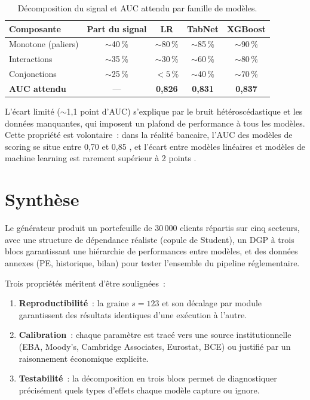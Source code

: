 \documentclass[12pt, a4paper, twoside, openright]{report}
\theoremstyle{definition}
\begin{document}
\begin{table}[htbp]
\centering
\caption{Décomposition du signal et AUC attendu par famille de modèles.}
\label{tab:signal_decomposition}
\begin{tabular}{lcccc}
\toprule
Composante & Part du signal & LR & TabNet & XGBoost \\
\midrule
Monotone (paliers) & $\sim$40\,\% & $\sim$80\,\% & $\sim$85\,\% & $\sim$90\,\% \\
Interactions         & $\sim$35\,\% & $\sim$30\,\% & $\sim$60\,\% & $\sim$80\,\% \\
Conjonctions         & $\sim$25\,\% & $< 5\,\%$    & $\sim$40\,\% & $\sim$70\,\% \\
\midrule
\textbf{AUC attendu} & --- & \textbf{0{,}826} & \textbf{0{,}831} & \textbf{0{,}837} \\
\bottomrule
\end{tabular}
\end{table}

L'écart limité ($\sim$1{,}1 point d'AUC) s'explique par le bruit hétéroscédastique et les données manquantes, qui imposent un plafond de performance à tous les modèles.
Cette propriété est volontaire~: dans la réalité bancaire, l'AUC des modèles de scoring se situe entre 0{,}70 et 0{,}85 \citep{siddiqi2006}, et l'écart entre modèles linéaires et modèles de machine learning est rarement supérieur à 2 points \citep{grinsztajn2022}.


\section{Synthèse}
\label{sec:donnees:synthese}

Le générateur produit un portefeuille de 30\,000 clients répartis sur cinq secteurs, avec une structure de dépendance réaliste (copule de Student), un DGP à trois blocs garantissant une hiérarchie de performances entre modèles, et des données annexes (PE, historique, bilan) pour tester l'ensemble du pipeline réglementaire.

Trois propriétés méritent d'être soulignées~:
\begin{enumerate}[nosep]
  \item \textbf{Reproductibilité}~: la graine $s = 123$ et son décalage par module garantissent des résultats identiques d'une exécution à l'autre.
  \item \textbf{Calibration}~: chaque paramètre est tracé vers une source institutionnelle (EBA, Moody's, Cambridge Associates, Eurostat, BCE) ou justifié par un raisonnement économique explicite.
  \item \textbf{Testabilité}~: la décomposition en trois blocs permet de diagnostiquer précisément quels types d'effets chaque modèle capture ou ignore.
\end{enumerate}
\end{document}
